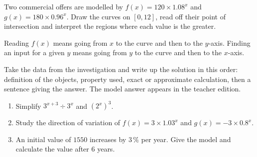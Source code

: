 \begin{activite}
Two commercial offers are modelled by $f(x)=120\times1.08^x$ and $g(x)=180\times0.96^x$. Draw the curves on $[0,12]$, read off their point of intersection and interpret the regions where each value is the greater.
\begin{center}\end{center}
\end{activite}

\begin{traceecrite}Reading $f(x)$ means going from $x$ to the curve and then to the $y$-axis. Finding an input for a given $y$ means going from $y$ to the curve and then to the $x$-axis.\end{traceecrite}

\begin{exemple}
Take the data from the investigation and write up the solution in this order: definition of the objects, property used, exact or approximate calculation, then a sentence giving the answer. The model answer appears in the teacher edition.
\end{exemple}

\begin{exercice}[-- essential]
\begin{enumerate}\item Simplify $3^{x+3}\div3^x$ and $(2^x)^3$.\item Study the direction of variation of $f(x)=3\times1.03^x$ and $g(x)=-3\times0.8^x$.\item An initial value of $1550$ increases by $3\,\%$ per year. Give the model and calculate the value after $6$ years.\end{enumerate}
\end{exercice}

